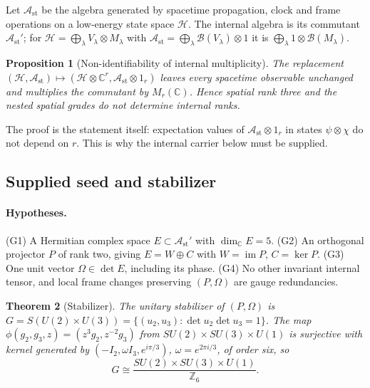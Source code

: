 \documentclass[11pt]{article}
\newtheorem{theorem}{Theorem}[section]
\newtheorem{proposition}[theorem]{Proposition}
\theoremstyle{definition}
\theoremstyle{remark}
\newcommand{\Z}{\mathbb{Z}}
\newcommand{\C}{\mathbb{C}}
\begin{document}
Let $\mathcal A_{\mathrm{st}}$ be the algebra generated by spacetime propagation, clock
and frame operations on a low-energy state space $\mathcal H$. The internal algebra is
its commutant $\mathcal A_{\mathrm{st}}'$; for $\mathcal H=\bigoplus_\lambda V_\lambda
\otimes M_\lambda$ with $\mathcal A_{\mathrm{st}}=\bigoplus_\lambda\mathcal B(V_\lambda)
\otimes1$ it is $\bigoplus_\lambda1\otimes\mathcal B(M_\lambda)$.

\begin{proposition}[Non-identifiability of internal multiplicity]
\label{prop:amplification}
The replacement $(\mathcal H,\mathcal A_{\mathrm{st}})\mapsto(\mathcal H\otimes\C^r,
\mathcal A_{\mathrm{st}}\otimes1_r)$ leaves every spacetime observable unchanged and
multiplies the commutant by $M_r(\C)$. Hence spatial rank three and the nested spatial
grades do not determine internal ranks.
\end{proposition}

The proof is the statement itself: expectation values of $\mathcal A_{\mathrm{st}}\otimes
1_r$ in states $\psi\otimes\chi$ do not depend on $r$. This is why the internal carrier
below must be supplied.

\subsection{Supplied seed and stabilizer}

\paragraph{Hypotheses.} (G1) A Hermitian complex space $E\subset\mathcal A_{\mathrm{st}}'$
with $\dim_\C E=5$. (G2) An orthogonal projector $P$ of rank two, giving
$E=W\oplus C$ with $W=\operatorname{im}P$, $C=\ker P$. (G3) One unit vector
$\Omega\in\det E$, including its phase. (G4) No other invariant internal tensor, and local
frame changes preserving $(P,\Omega)$ are gauge redundancies.

\begin{theorem}[Stabilizer]
\label{thm:stabilizer}
The unitary stabilizer of $(P,\Omega)$ is $G=S(U(2)\times U(3))=\{(u_2,u_3):\det u_2
\det u_3=1\}$. The map $\phi(g_2,g_3,z)=(z^3g_2,z^{-2}g_3)$ from $SU(2)\times SU(3)\times
U(1)$ is surjective with kernel generated by $(-I_2,\omega I_3,e^{i\pi/3})$,
$\omega=e^{2\pi i/3}$, of order six, so
\begin{equation}
G\cong\frac{SU(2)\times SU(3)\times U(1)}{\Z_6}.
\end{equation}
\end{theorem}
\end{document}
